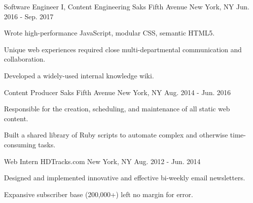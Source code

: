 \begin{cventries}
  \cventry
    {Software Engineer I, Content Engineering} %
    {Saks Fifth Avenue} %
    {New York, NY} %
    {Jun. 2016 - Sep. 2017} %
    {
      \begin{cvitems} %
       \item {Wrote high-performance JavaScript, modular CSS, semantic HTML5.}
       \item {Unique web experiences required close multi-departmental communication and collaboration.}
       \item {Developed a widely-used internal knowledge wiki.}
      \end{cvitems}
    }    

  \cventry
    {Content Producer} %
    {Saks Fifth Avenue} %
    {New York, NY} %
    {Aug. 2014 - Jun. 2016} %
    {
      \begin{cvitems} %
        \item {Responsible for the creation, scheduling, and maintenance of all static web content.}
        \item {Built a shared library of Ruby scripts to automate complex and otherwise time-consuming tasks.}
      \end{cvitems}
    }

  \cventry
    {Web Intern} %
    {HDTracks.com} %
    {New York, NY} %
    {Aug. 2012 - Jun. 2014} %
    {
      \begin{cvitems} %
        \item {Designed and implemented innovative and effective bi-weekly email newsletters.}
        \item {Expansive subscriber base (200,000+) left no margin for error.}
      \end{cvitems}
    }


\end{cventries}
